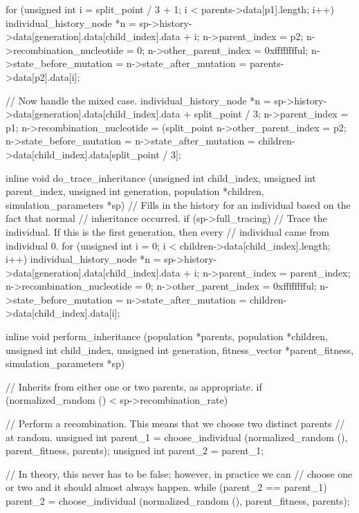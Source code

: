\documentclass{article}
\begin{document}
\begin{ccode}
{{    for (unsigned int i = split_point / 3 + 1; i < parents->data[p1].length; i++) {
      individual_history_node *n =
        sp->history->data[generation].data[child_index].data + i;
      n->parent_index = p2;
      n->recombination_nucleotide = 0;
      n->other_parent_index = 0xfffffffful;
      n->state_before_mutation = n->state_after_mutation =
        parents->data[p2].data[i];
    }

    // Now handle the mixed case.
    individual_history_node *n =
      sp->history->data[generation].data[child_index].data + split_point / 3;
    n->parent_index = p1;
    n->recombination_nucleotide = (split_point %
    n->other_parent_index = p2;
    n->state_before_mutation = n->state_after_mutation =
      children->data[child_index].data[split_point / 3];
  }
}

inline void do_trace_inheritance (unsigned int child_index, unsigned int parent_index,
				  unsigned int generation, population *children,
				  simulation_parameters *sp) {
  // Fills in the history for an individual based on the fact that normal
  // inheritance occurred.
  if (sp->full_tracing)
    // Trace the individual. If this is the first generation, then every
    // individual came from individual 0.
    for (unsigned int i = 0; i < children->data[child_index].length; i++) {
      individual_history_node *n = sp->history->data[generation].data[child_index].data + i;
      n->parent_index = parent_index;
      n->recombination_nucleotide = 0;
      n->other_parent_index = 0xfffffffful;
      n->state_before_mutation = n->state_after_mutation =
       children->data[child_index].data[i];
    }
}

inline void perform_inheritance (population *parents, population *children,
				 unsigned int child_index, unsigned int generation,
				 fitness_vector *parent_fitness,
				 simulation_parameters *sp) {
  // Inherits from either one or two parents, as appropriate.
  if (normalized_random () < sp->recombination_rate) {
    // Perform a recombination. This means that we choose two distinct parents
    // at random.
    unsigned int parent_1 = choose_individual (normalized_random (), parent_fitness, parents);
    unsigned int parent_2 = parent_1;

    // In theory, this never has to be false; however, in practice we can
    // choose one or two and it should almost always happen.
    while (parent_2 == parent_1)
      parent_2 = choose_individual (normalized_random (), parent_fitness, parents);

}}
\end{ccode}
\end{document}

